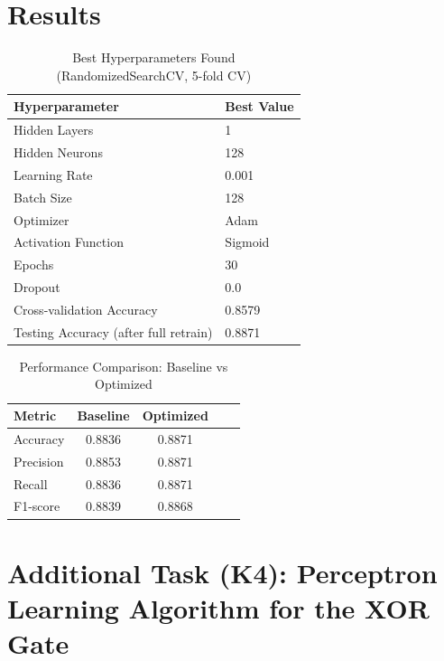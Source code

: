 \documentclass[11pt]{article}
\begin{document}
\section{Results}

\begin{table}[H]
\centering
\caption{Best Hyperparameters Found (RandomizedSearchCV, 5-fold CV)}
\begin{tabular}{@{}ll@{}}
\toprule
\textbf{Hyperparameter} & \textbf{Best Value} \\
\midrule
Hidden Layers       & 1 \\
Hidden Neurons      & 128 \\
Learning Rate       & 0.001 \\
Batch Size          & 128 \\
Optimizer           & Adam \\
Activation Function & Sigmoid \\
Epochs              & 30 \\
Dropout             & 0.0 \\
\midrule
Cross-validation Accuracy & 0.8579 \\
Testing Accuracy (after full retrain) & 0.8871 \\
\bottomrule
\end{tabular}
\end{table}

\begin{table}[H]
\centering
\caption{Performance Comparison: Baseline vs Optimized}
\begin{tabular}{@{}lcccc@{}}
\toprule
\textbf{Metric} & \textbf{Baseline} & \textbf{Optimized} \\
\midrule
Accuracy  & 0.8836 & 0.8871 \\
Precision & 0.8853 & 0.8871 \\
Recall    & 0.8836 & 0.8871 \\
F1-score  & 0.8839 & 0.8868 \\
\bottomrule
\end{tabular}
\end{table}

\section{Additional Task (K4): Perceptron Learning Algorithm for the XOR Gate}
\end{document}
